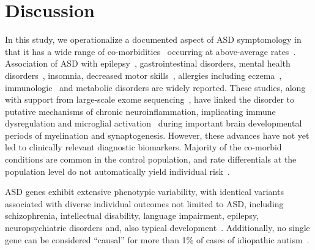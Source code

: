 \documentclass[onecolumn,10pt]{IEEEtran}
\begin{document}
\section*{Discussion}
In this study, we operationalize a documented aspect of ASD symptomology in  that it has   a wide range  of co-morbidities~\cite{pmid22511918,pmid30733689,pmid25681541} occurring at above-average  rates~\cite{hyman2020identification}. Association of ASD  with epilepsy~\cite{pmid23935565}, gastrointestinal disorders\cite{pmid30646068,pmid21651783,pmid30823414,pmid21282636,pmid29028817,pmid30109601}, mental health disorders~\cite{pmid24729779}, insomnia, decreased motor skills~\cite{pmid30337860}, allergies including eczema~\cite{pmid30646068,pmid21651783,pmid30823414,pmid21282636,pmid29028817,pmid30109601}, immunologic~\cite{pmid30971960,pmid30941018,pmid29691724,pmid29307081,pmid27351598,pmid26793298,pmid30095240,pmid25681541} and metabolic\cite{pmid30178105,pmid27957319,pmid29028817} disorders are  widely reported. These studies, along with support from large-scale exome sequencing~\cite{Satterstrom484113,pmid25038753}, have linked the disorder to putative mechanisms of  chronic neuroinflammation,  implicating immune dysregulation and microglial activation~\cite{pmid15546155,pmid21595886,pmid21629840,pmid26793298,pmid30483058,pmid29691724} during important brain developmental periods  of  myelination and synaptogenesis. However, these advances have not yet led  to   clinically relevant diagnostic biomarkers.  Majority of the co-morbid conditions are common in the control population, and  rate differentials at the population level do not automatically yield individual risk~\cite{Pearce2000}.

ASD genes exhibit extensive phenotypic variability, with identical variants associated with diverse individual outcomes not limited to ASD, including schizophrenia, intellectual disability, language impairment, epilepsy, neuropsychiatric disorders and, also typical development~\cite{pmid23537858}. Additionally, no single
gene can be considered ``causal'' for more than 1\% of cases of idiopathic autism~\cite{pmid23637569}.
\end{document}
